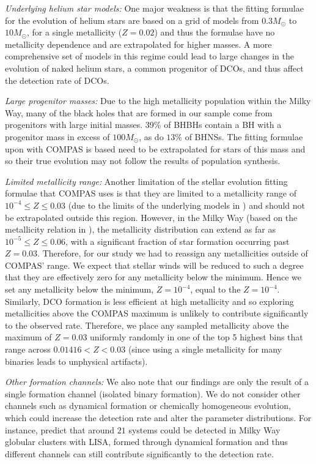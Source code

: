 \textit{Underlying helium star models:} One major weakness is that the \citet{Hurley+2000} fitting formulae for the evolution of helium stars are based on a grid of models from $0.3 \unit{M_{\odot}}$ to $10 \unit{M_{\odot}}$, for a single metallicity ($Z= 0.02$) and thus the formulae have no metallicity dependence and are extrapolated for higher masses. A more comprehensive set of models in this regime could lead to large changes in the evolution of naked helium stars, a common progenitor of DCOs, and thus affect the detection rate of DCOs.

\textit{Large progenitor masses:} Due to the high metallicity population within the Milky Way, many of the black holes that are formed in our sample come from progenitors with large initial masses. 39\% of BHBHs contain a BH with a progenitor mass in excess of $100 \unit{M_\odot}$, as do $13\%$ of BHNSs. The fitting formulae upon with COMPAS is based need to be extrapolated for stars of this mass and so their true evolution may not follow the results of population synthesis.

\textit{Limited metallicity range:} Another limitation of the stellar evolution fitting formulae that COMPAS uses is that they are limited to a metallicity range of $10^{-4} \le Z \le 0.03$ (due to the limits of the underlying models in \citet{Hurley+2000}) and should not be extrapolated outside this region. However, in the Milky Way (based on the metallicity relation in \citealt{Frankel+2018}), the metallicity distribution can extend as far as $10^{-5} \le Z \le 0.06$, with a significant fraction of star formation occurring past $Z = 0.03$. Therefore, for our study we had to reassign any metallicities outside of COMPAS' range. We expect that stellar winds will be reduced to such a degree that they are effectively zero for any metallicity below the minimum. Hence we set any metallicity below the minimum, $Z = 10^{-4}$, equal to the $Z = 10^{-4}$. Similarly, DCO formation is less efficient at high metallicity \citep[e.g.][]{Broekgaarden+2021} and so exploring metallicities above the COMPAS maximum is unlikely to contribute significantly to the observed rate. Therefore, we place any sampled metallicity above the maximum of $Z = 0.03$ uniformly randomly in one of the top 5 highest bins that range across $0.01416 < Z < 0.03$ (since using a single metallicity for many binaries leads to unphysical artifacts).

\textit{Other formation channels:} We also note that our findings are only the result of a single formation channel (isolated binary formation). We do not consider other channels such as dynamical formation or chemically homogeneous evolution, which could increase the detection rate and alter the parameter distributions. For instance, \citet{Kremer+2018} predict that around $21$ systems could be detected in Milky Way globular clusters with LISA, formed through dynamical formation and thus different channels can still contribute significantly to the detection rate.

